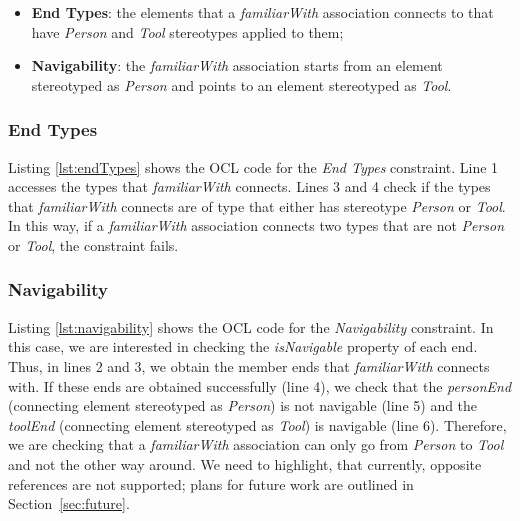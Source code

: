 \begin{itemize}
	\item \textbf{End Types}: the elements that a \emph{familiarWith} association connects to that have \emph{Person} and \emph{Tool} stereotypes applied to them;
	\item \textbf{Navigability}: the \emph{familiarWith} association starts from an element stereotyped as \emph{Person} and points to an element stereotyped as \emph{Tool}.
\end{itemize}

\subsubsection{End Types}
Listing \ref{lst:endTypes} shows the OCL code for the \emph{End Types} constraint. 
Line 1 accesses the types that \emph{familiarWith} connects. 
Lines 3 and 4 check if the types that \emph{familiarWith} connects are of type that either has stereotype \emph{Person} or \emph{Tool}. 
In this way, if a \emph{familiarWith} association connects two types that are not \emph{Person} or \emph{Tool}, the constraint fails.




\subsubsection{Navigability}
Listing \ref{lst:navigability} shows the OCL code for the \emph{Navigability} constraint. 
In this case, we are interested in checking the \emph{isNavigable} property of each end. 
Thus, in lines 2 and 3, we obtain the member ends that \emph{familiarWith} connects with. 
If these ends are obtained successfully (line 4), we check that the \emph{personEnd} (connecting element stereotyped as \emph{Person}) is not navigable (line 5) and the \emph{toolEnd} (connecting element stereotyped as \emph{Tool}) is navigable (line 6). 
Therefore, we are checking that a \emph{familiarWith} association can only go from \emph{Person} to \emph{Tool} and not the other way around. 
We need to highlight, that currently, opposite references are not supported; plans for future work are outlined in Section~\ref{sec:future}.

